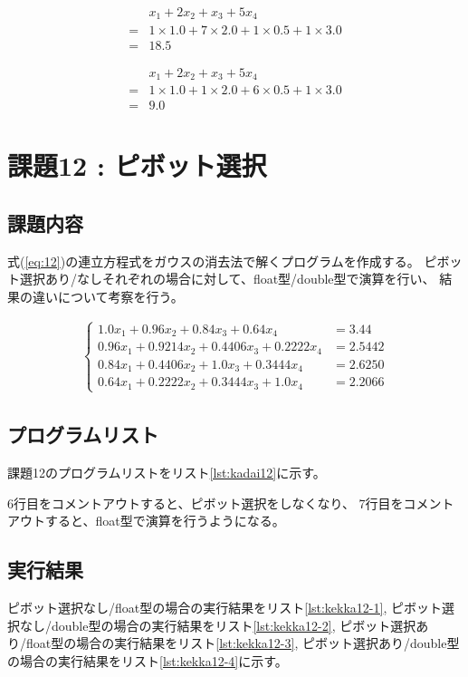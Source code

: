\documentclass[a4j,titlepage]{jsarticle}
\begin{document}
\begin{align}
  & x_1 + 2 x_2 + x_3 + 5 x_4 \nonumber \\
  = & 1 \times 1.0 + 7 \times 2.0 + 1 \times 0.5 + 1 \times 3.0
  \label{eq:9-3} \\
  = & 18.5 \nonumber
\end{align}

\begin{align}
  & x_1 + 2 x_2 + x_3 + 5 x_4 \nonumber \\
  = & 1 \times 1.0 + 1 \times 2.0 + 6 \times 0.5 + 1 \times 3.0
  \label{eq:9-4} \\
  = & 9.0 \nonumber
\end{align}


\section{課題12 : ピボット選択}
\subsection{課題内容}
式(\ref{eq:12})の連立方程式をガウスの消去法で解くプログラムを作成する。
ピボット選択あり/なしそれぞれの場合に対して、float型/double型で演算を行い、
結果の違いについて考察を行う。

\begin{align}
  \begin{cases}
    1.0  x_1 + 0.96   x_2 + 0.84   x_3 + 0.64   x_4 &= 3.44 \\
    0.96 x_1 + 0.9214 x_2 + 0.4406 x_3 + 0.2222 x_4 &= 2.5442 \\
    0.84 x_1 + 0.4406 x_2 + 1.0    x_3 + 0.3444 x_4 &= 2.6250 \\
    0.64 x_1 + 0.2222 x_2 + 0.3444 x_3 + 1.0    x_4 &= 2.2066
  \end{cases}
  \label{eq:12}
\end{align}

\subsection{プログラムリスト}
課題12のプログラムリストをリスト\ref{lst:kadai12}に示す。

6行目をコメントアウトすると、ピボット選択をしなくなり、
7行目をコメントアウトすると、float型で演算を行うようになる。



\subsection{実行結果}
ピボット選択なし/float型の場合の実行結果をリスト\ref{lst:kekka12-1}, 
ピボット選択なし/double型の場合の実行結果をリスト\ref{lst:kekka12-2}, 
ピボット選択あり/float型の場合の実行結果をリスト\ref{lst:kekka12-3}, 
ピボット選択あり/double型の場合の実行結果をリスト\ref{lst:kekka12-4}に示す。
\end{document}
